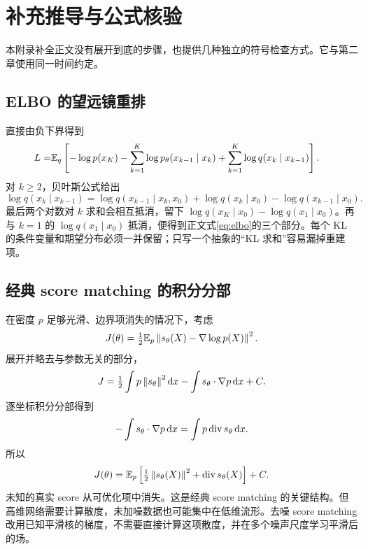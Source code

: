 \chapter{补充推导与公式核验}\label{app:proofs}
本附录补全正文没有展开到底的步骤，也提供几种独立的符号检查方式。它与第二章使用同一时间约定。

\section{ELBO 的望远镜重排}
直接由负下界得到
\begin{align}
 L=&\mathbb{E}_q\left[-\log p(x_K)-\sum_{k=1}^K\log p_\theta(x_{k-1}\mid x_k)
 +\sum_{k=1}^K\log q(x_k\mid x_{k-1})\right].
\end{align}
对 $k\ge2$，贝叶斯公式给出
\begin{equation}
 \log q(x_k\mid x_{k-1})=
 \log q(x_{k-1}\mid x_k,x_0)+\log q(x_k\mid x_0)-\log q(x_{k-1}\mid x_0).
\end{equation}
最后两个对数对 $k$ 求和会相互抵消，留下 $\log q(x_K\mid x_0)-\log q(x_1\mid x_0)$。再与 $k=1$ 的 $\log q(x_1\mid x_0)$ 抵消，便得到正文式\eqref{eq:elbo}的三个部分。每个 KL 的条件变量和期望分布必须一并保留；只写一个抽象的“KL 求和”容易漏掉重建项。

\section{经典 score matching 的积分分部}
在密度 $p$ 足够光滑、边界项消失的情况下，考虑
\begin{equation}
 J(\theta)=\tfrac12\mathbb{E}_p\left\lVert s_\theta(X)-\nabla\log p(X)\right\rVert^2.
\end{equation}
展开并略去与参数无关的部分，
\begin{equation}
 J=\tfrac12\int p\left\lVert s_\theta\right\rVert^2\mathop{}\!\mathrm{d} x
 -\int s_\theta\cdot\nabla p\mathop{}\!\mathrm{d} x+C.
\end{equation}
逐坐标积分分部得到
\begin{equation}
 -\int s_\theta\cdot\nabla p\mathop{}\!\mathrm{d} x=\int p\operatorname{div} s_\theta\mathop{}\!\mathrm{d} x.
\end{equation}
所以
\begin{equation}
 J(\theta)=\mathbb{E}_p\left[\tfrac12\left\lVert s_\theta(X)\right\rVert^2+\operatorname{div} s_\theta(X)\right]+C.
\end{equation}
未知的真实 score 从可优化项中消失。这是经典 score matching 的关键结构\cite{r_scorematching}。但高维网络需要计算散度，未加噪数据也可能集中在低维流形。去噪 score matching 改用已知平滑核的梯度，不需要直接计算这项散度，并在多个噪声尺度学习平滑后的场。

